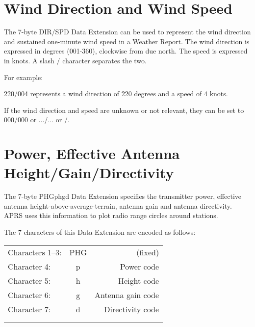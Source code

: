 \section {Wind Direction and Wind Speed}

The 7-byte DIR/SPD Data Extension can be used to represent the wind
direction and sustained one-minute wind speed in a Weather Report.
The wind direction is expressed in degrees (001-360), clockwise from due
north. The speed is expressed in knots. A slash / character separates the two.

For example:

220/004 represents a wind direction of 220 degrees and a speed of 4 knots.

If the wind direction and speed are unknown or not relevant, they can be set
to 000/000 or .../... or  \textvisiblespace \textvisiblespace \textvisiblespace
/\textvisiblespace \textvisiblespace \textvisiblespace .

\section{Power, Effective Antenna Height/Gain/Directivity}

The 7-byte PHGphgd Data Extension specifies the transmitter power,
effective antenna height-above-average-terrain, antenna gain and antenna
directivity. APRS uses this information to plot radio range circles around
stations.


The 7 characters of this Data Extension are encoded as follows:

\begin{tabular}{lcr}

Characters 1–3: & PHG & (fixed) \\

Character 4: & p & Power code \\

Character 5: & h & Height code \\

Character 6: & g & Antenna gain code \\

Character 7: & d & Directivity code \\

& \\
& \\
\end{tabular}





